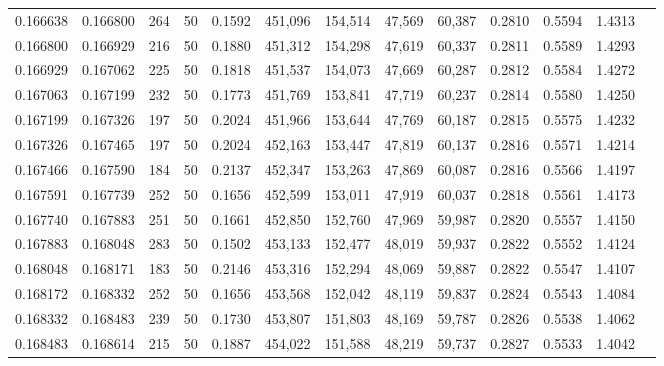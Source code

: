 \begin{tabular}{rrrrrrrrrrrrr}
0.166638 & 0.166800 &   264 &  50 &                                     0.1592 & 451,096 & 154,514 &  47,569 &  60,387 & 0.2810 & 0.5594 & 1.4313 \\
0.166800 & 0.166929 &   216 &  50 &                                     0.1880 & 451,312 & 154,298 &  47,619 &  60,337 & 0.2811 & 0.5589 & 1.4293 \\
0.166929 & 0.167062 &   225 &  50 &                                     0.1818 & 451,537 & 154,073 &  47,669 &  60,287 & 0.2812 & 0.5584 & 1.4272 \\
0.167063 & 0.167199 &   232 &  50 &                                     0.1773 & 451,769 & 153,841 &  47,719 &  60,237 & 0.2814 & 0.5580 & 1.4250 \\
0.167199 & 0.167326 &   197 &  50 &                                     0.2024 & 451,966 & 153,644 &  47,769 &  60,187 & 0.2815 & 0.5575 & 1.4232 \\
0.167326 & 0.167465 &   197 &  50 &                                     0.2024 & 452,163 & 153,447 &  47,819 &  60,137 & 0.2816 & 0.5571 & 1.4214 \\
0.167466 & 0.167590 &   184 &  50 &                                     0.2137 & 452,347 & 153,263 &  47,869 &  60,087 & 0.2816 & 0.5566 & 1.4197 \\
0.167591 & 0.167739 &   252 &  50 &                                     0.1656 & 452,599 & 153,011 &  47,919 &  60,037 & 0.2818 & 0.5561 & 1.4173 \\
0.167740 & 0.167883 &   251 &  50 &                                     0.1661 & 452,850 & 152,760 &  47,969 &  59,987 & 0.2820 & 0.5557 & 1.4150 \\
0.167883 & 0.168048 &   283 &  50 &                                     0.1502 & 453,133 & 152,477 &  48,019 &  59,937 & 0.2822 & 0.5552 & 1.4124 \\
0.168048 & 0.168171 &   183 &  50 &                                     0.2146 & 453,316 & 152,294 &  48,069 &  59,887 & 0.2822 & 0.5547 & 1.4107 \\
0.168172 & 0.168332 &   252 &  50 &                                     0.1656 & 453,568 & 152,042 &  48,119 &  59,837 & 0.2824 & 0.5543 & 1.4084 \\
0.168332 & 0.168483 &   239 &  50 &                                     0.1730 & 453,807 & 151,803 &  48,169 &  59,787 & 0.2826 & 0.5538 & 1.4062 \\
0.168483 & 0.168614 &   215 &  50 &                                     0.1887 & 454,022 & 151,588 &  48,219 &  59,737 & 0.2827 & 0.5533 & 1.4042 \\

\end{tabular}
